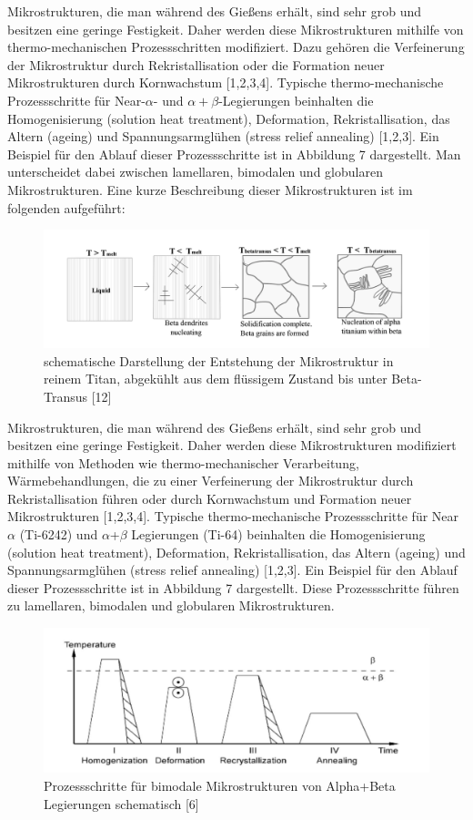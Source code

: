 Mikrostrukturen, die man während des Gießens erhält, sind sehr grob und besitzen eine geringe Festigkeit. Daher werden diese Mikrostrukturen mithilfe von thermo-mechanischen Prozessschritten modifiziert. Dazu gehören die Verfeinerung der Mikrostruktur durch Rekristallisation oder die Formation neuer Mikrostrukturen durch Kornwachstum [1,2,3,4].
Typische thermo-mechanische Prozessschritte für Near-$\alpha$- und $\alpha+\beta$-Legierungen beinhalten die Homogenisierung (solution heat treatment), Deformation, Rekristallisation, das Altern (ageing) und Spannungsarmglühen (stress relief annealing) [1,2,3]. Ein Beispiel für den Ablauf dieser Prozessschritte ist in Abbildung 7 dargestellt. Man unterscheidet dabei zwischen lamellaren, bimodalen und globularen Mikrostrukturen.
Eine kurze Beschreibung dieser Mikrostrukturen ist im folgenden aufgeführt:
\begin{figure}[h]
	\centering
	\includegraphics[width=0.8\linewidth]{"Bilder/Abbildung 6"}
	\caption[Abbildung 6]{schematische Darstellung der Entstehung der Mikrostruktur in reinem Titan, abgekühlt aus dem flüssigem Zustand bis unter Beta-Transus [12]}
	\label{fig:abbildung-6}
\end{figure}


Mikrostrukturen, die man während des Gießens erhält, sind sehr grob und besitzen eine geringe Festigkeit. Daher werden diese Mikrostrukturen modifiziert mithilfe von Methoden wie thermo-mechanischer Verarbeitung, Wärmebehandlungen, die zu einer Verfeinerung der Mikrostruktur durch Rekristallisation führen oder durch Kornwachstum und Formation neuer Mikrostrukturen [1,2,3,4].
Typische thermo-mechanische Prozessschritte für Near $\alpha$ (Ti-6242) und $\alpha$+$\beta$ Legierungen (Ti-64) beinhalten die Homogenisierung (solution heat treatment), Deformation, Rekristallisation, das Altern (ageing) und Spannungsarmglühen (stress relief annealing) [1,2,3]. Ein Beispiel für den Ablauf dieser Prozessschritte ist in Abbildung 7 dargestellt. Diese Prozessschritte führen zu lamellaren, bimodalen und globularen Mikrostrukturen.

\begin{figure}[h]
	\centering
	\includegraphics[width=0.9\linewidth]{"Bilder/Abbildung 7"}
	\caption[Abbildung 7]{Prozessschritte für bimodale Mikrostrukturen von Alpha+Beta Legierungen schematisch [6]}
	\label{fig:abbildung-7}
\end{figure}

